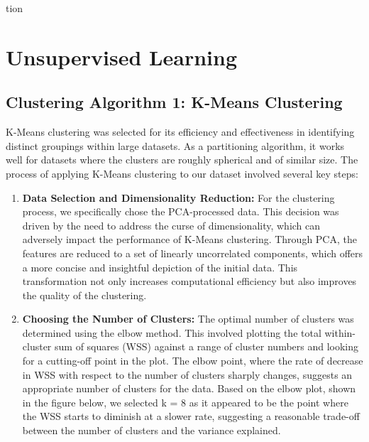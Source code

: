 tion\documentclass[8pt]{article}
\begin{document}
\section{Unsupervised Learning}

\subsection{Clustering Algorithm 1: K-Means Clustering}
K-Means clustering was selected for its efficiency and effectiveness in identifying distinct groupings within large datasets. As a partitioning algorithm, it works well for datasets where the clusters are roughly spherical and of similar size. 
The process of applying K-Means clustering to our dataset involved several key steps:

\begin{enumerate}
    \item \textbf{Data Selection and Dimensionality Reduction:} For the clustering process, we specifically chose the PCA-processed data. This decision was driven by the need to address the curse of dimensionality, which can adversely impact the performance of K-Means clustering. Through PCA, the features are reduced to a set of linearly uncorrelated components, which offers a more concise and insightful depiction of the initial data. This transformation not only increases computational efficiency but also improves the quality of the clustering. 
    
    \item \textbf{Choosing the Number of Clusters:} The optimal number of clusters was determined using the elbow method. This involved plotting the total within-cluster sum of squares (WSS) against a range of cluster numbers and looking for a cutting-off point in the plot. The elbow point, where the rate of decrease in WSS with respect to the number of clusters sharply changes, suggests an appropriate number of clusters for the data. Based on the elbow plot, shown in the figure below, we selected k = 8 as it appeared to be the point where the WSS starts to diminish at a slower rate, suggesting a reasonable trade-off between the number of clusters and the variance explained.


\end{enumerate}
\end{document}
